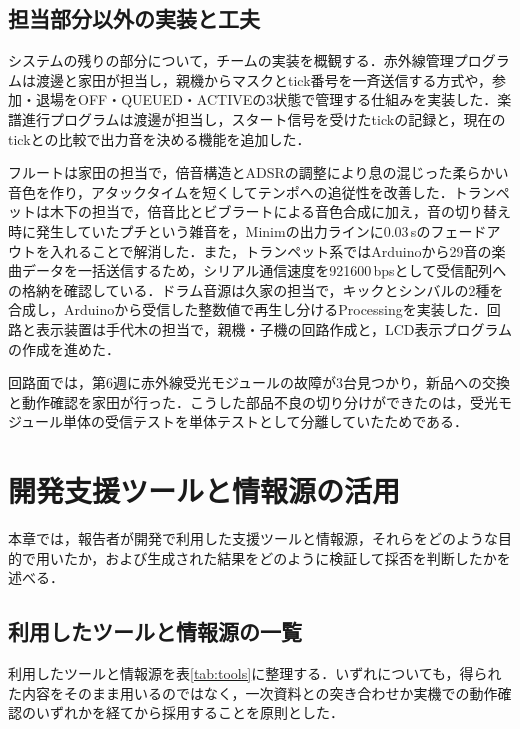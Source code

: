 \documentclass[uplatex,dvipdfmx]{jlreq}
\begin{document}
\subsection{担当部分以外の実装と工夫}

システムの残りの部分について，チームの実装を概観する．赤外線管理プログラムは渡邊と家田が担当し，親機からマスクとtick番号を一斉送信する方式や，参加・退場をOFF・QUEUED・ACTIVEの3状態で管理する仕組みを実装した．楽譜進行プログラムは渡邊が担当し，スタート信号を受けたtickの記録と，現在のtickとの比較で出力音を決める機能を追加した．

フルートは家田の担当で，倍音構造とADSRの調整により息の混じった柔らかい音色を作り，アタックタイムを短くしてテンポへの追従性を改善した．トランペットは木下の担当で，倍音比とビブラートによる音色合成に加え，音の切り替え時に発生していたプチという雑音を，Minimの出力ラインに0.03\,sのフェードアウトを入れることで解消した．また，トランペット系ではArduinoから29音の楽曲データを一括送信するため，シリアル通信速度を921600\,bpsとして受信配列への格納を確認している．ドラム音源は久家の担当で，キックとシンバルの2種を合成し，Arduinoから受信した整数値で再生し分けるProcessingを実装した．回路と表示装置は手代木の担当で，親機・子機の回路作成と，LCD表示プログラムの作成を進めた．

回路面では，第6週に赤外線受光モジュールの故障が3台見つかり，新品への交換と動作確認を家田が行った．こうした部品不良の切り分けができたのは，受光モジュール単体の受信テストを単体テストとして分離していたためである．

\section{開発支援ツールと情報源の活用}
\label{sec:tools}

本章では，報告者が開発で利用した支援ツールと情報源，それらをどのような目的で用いたか，および生成された結果をどのように検証して採否を判断したかを述べる．

\subsection{利用したツールと情報源の一覧}

利用したツールと情報源を表\ref{tab:tools}に整理する．いずれについても，得られた内容をそのまま用いるのではなく，一次資料との突き合わせか実機での動作確認のいずれかを経てから採用することを原則とした．
\end{document}
